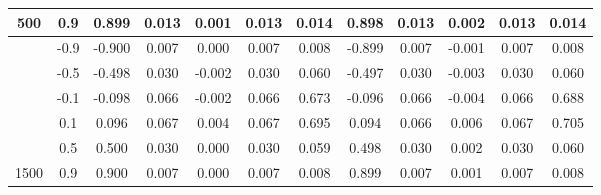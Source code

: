 \begin{table}[h]
{\begin{tabular}{|c|cccccc|ccccc|}
    \multirow{-6}{*}{500} & \multicolumn{1}{c|}{0.9} & \multicolumn{1}{c|}{0.899} & \multicolumn{1}{c|}{0.013} & \multicolumn{1}{c|}{0.001} & \multicolumn{1}{c|}{0.013} & 0.014 & \multicolumn{1}{c|}{0.898} & \multicolumn{1}{c|}{0.013} & \multicolumn{1}{c|}{0.002} & \multicolumn{1}{c|}{0.013} & 0.014 \\ \hline
     & \multicolumn{1}{c|}{-0.9} & \multicolumn{1}{c|}{-0.900} & \multicolumn{1}{c|}{0.007} & \multicolumn{1}{c|}{0.000} & \multicolumn{1}{c|}{0.007} & 0.008 & \multicolumn{1}{c|}{-0.899} & \multicolumn{1}{c|}{0.007} & \multicolumn{1}{c|}{-0.001} & \multicolumn{1}{c|}{0.007} & 0.008 \\ \cline{2-12} 
     & \multicolumn{1}{c|}{-0.5} & \multicolumn{1}{c|}{-0.498} & \multicolumn{1}{c|}{0.030} & \multicolumn{1}{c|}{-0.002} & \multicolumn{1}{c|}{0.030} & 0.060 & \multicolumn{1}{c|}{-0.497} & \multicolumn{1}{c|}{0.030} & \multicolumn{1}{c|}{-0.003} & \multicolumn{1}{c|}{0.030} & 0.060 \\ \cline{2-12} 
     & \multicolumn{1}{c|}{-0.1} & \multicolumn{1}{c|}{-0.098} & \multicolumn{1}{c|}{0.066} & \multicolumn{1}{c|}{-0.002} & \multicolumn{1}{c|}{0.066} & 0.673 & \multicolumn{1}{c|}{-0.096} & \multicolumn{1}{c|}{0.066} & \multicolumn{1}{c|}{-0.004} & \multicolumn{1}{c|}{0.066} & 0.688 \\ \cline{2-12} 
     & \multicolumn{1}{c|}{0.1} & \multicolumn{1}{c|}{0.096} & \multicolumn{1}{c|}{0.067} & \multicolumn{1}{c|}{0.004} & \multicolumn{1}{c|}{0.067} & 0.695 & \multicolumn{1}{c|}{0.094} & \multicolumn{1}{c|}{0.066} & \multicolumn{1}{c|}{0.006} & \multicolumn{1}{c|}{0.067} & 0.705 \\ \cline{2-12} 
     & \multicolumn{1}{c|}{0.5} & \multicolumn{1}{c|}{0.500} & \multicolumn{1}{c|}{0.030} & \multicolumn{1}{c|}{0.000} & \multicolumn{1}{c|}{0.030} & 0.059 & \multicolumn{1}{c|}{0.498} & \multicolumn{1}{c|}{0.030} & \multicolumn{1}{c|}{0.002} & \multicolumn{1}{c|}{0.030} & 0.060 \\ \cline{2-12} 
    \multirow{-6}{*}{1500} & \multicolumn{1}{c|}{0.9} & \multicolumn{1}{c|}{0.900} & \multicolumn{1}{c|}{0.007} & \multicolumn{1}{c|}{0.000} & \multicolumn{1}{c|}{0.007} & 0.008 & \multicolumn{1}{c|}{0.899} & \multicolumn{1}{c|}{0.007} & \multicolumn{1}{c|}{0.001} & \multicolumn{1}{c|}{0.007} & 0.008 \\ \hline
    \end{tabular}
    }
    \label{table:performance}
    \end{table}

\clearpage
\newpage

